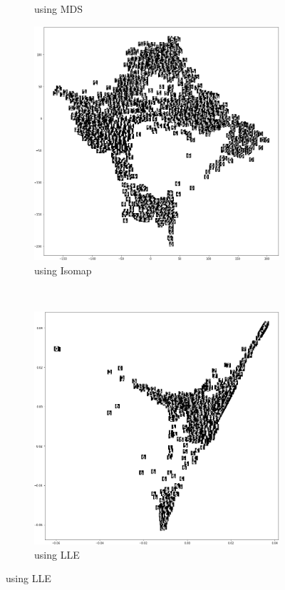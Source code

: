 \begin{figure}
\begin{subfigure}[b]{0.4\textwidth}
		\caption{using MDS}
	\end{subfigure}
	\begin{subfigure}[b]{0.4\textwidth}
		\includegraphics[width=\textwidth]{./figures/isomap_2.png}
		\caption{using Isomap}
	\end{subfigure}
	~
	\begin{subfigure}[b]{0.4\textwidth}
		\includegraphics[width=\textwidth]{./figures/lle_2.png}
		\caption{using LLE}
	\end{subfigure}
	

\end{figure}
